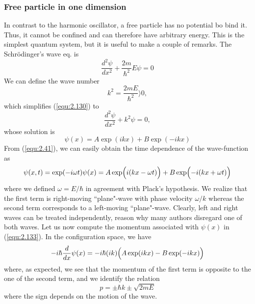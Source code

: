 \subsubsection{Free particle in one dimension}
In contrast to the harmonic oscillator, a free particle has
no potential bo bind it. Thus, it cannot be confined and can
therefore have arbitrary energy. This is the simplest
quantum system, but it is useful to make a couple of
remarks.
The Schrödinger's wave eq. is
\begin{equation}
  \frac{d^2 \psi}{d x^2} + \frac{2m}{\hbar^2} E \psi = 0
  \label{equ:2.130}
\end{equation}
We can define the wave number
\begin{equation}
  k^2 = \frac{2mE}{\hbar^2} \rangle  0,
  \label{equ:1.131}
\end{equation}
which simplifies (\ref{equ:2.130}) to
\begin{equation}
  \frac{d^2 \psi}{dx^2 } + k^2 \psi = 0,
  \label{equ:1.132}
\end{equation}
whose solution is
\begin{equation}
  \psi(x) = A \exp(ikx) + B \exp(-ikx)
  \label{equ:2.133}
\end{equation}
From (\ref{equ:2.41}), we can easily obtain the time
dependence of the wave-function as
\begin{equation}
  \psi(x,t) = \exp(-i\omega t) \psi(x) = A
  \exp\Bigl(i(kx-\omega t)\Bigr)
  +
  B
  \exp\Bigl(-i(kx+\omega t)\Bigr)
  \label{equ:2.134}
\end{equation}
where we defined $\omega = E/\hbar$ in agreement with
Plack's hypothesis.
We realize that the first term is right-moving ``plane"-wave
with phase velocity $\omega / k$ whereas the second term
corresponds to a left-moving ``plane"-wave. Clearly, left
and right waves can be treated independently, reason why
many authors disregard one of both waves.
Let us now compute the momentum associated with $\psi(x)$ in
(\ref{equ:2.133}). In the configuration space, we have
\begin{equation}
  -i\hbar \frac{d}{dx} \psi(x) = -i\hbar(ik) \Bigl(A
  \exp(ikx) - B\exp(-ikx)\Bigr)
  \label{equ:2.135}
\end{equation}
where, as expected, we see that the momentum of the  first
term is opposite to the one of the second term, and we
identify the relation
\begin{equation}
  p = \pm \hbar k \pm \sqrt{2mE}
  \label{equ:2.136}
\end{equation}
where the sign depends on the motion of the wave.
